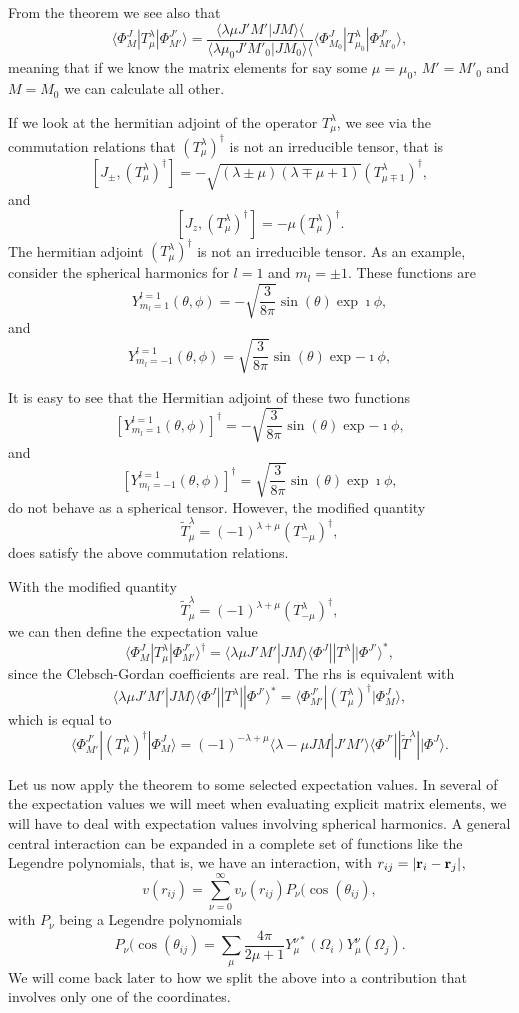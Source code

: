 {From the theorem we see also that 
\[
\langle \Phi^J_M|T^{\lambda}_{\mu}|\Phi^{J'}_{M'}\rangle=\frac{\langle \lambda \mu J'M'|JM\rangle\langle }{\langle \lambda \mu_0 J'M'_0|JM_0\rangle\langle }\langle \Phi^J_{M_0}|T^{\lambda}_{\mu_0}|\Phi^{J'}_{M'_0}\rangle,
\]
meaning that if we know the matrix elements for say some $\mu=\mu_0$, $M'=M'_0$ and $M=M_0$ we can calculate all other. 

If we look at the hermitian adjoint of the operator $T^{\lambda}_{\mu}$, 
we see via the commutation relations that $(T^{\lambda}_{\mu})^{\dagger}$ is not an irreducible tensor, that is
\[
[J_{\pm}, (T^{\lambda}_{\mu})^{\dagger}]= -\sqrt{(\lambda\pm \mu)(\lambda\mp \mu+1)}(T^{\lambda}_{\mu\mp 1})^{\dagger},
\]
and 
\[
[J_{z}, (T^{\lambda}_{\mu})^{\dagger}]=-\mu (T^{\lambda}_{\mu})^{\dagger}.
\]
The hermitian adjoint $(T^{\lambda}_{\mu})^{\dagger}$ is not an irreducible tensor. As an example, consider the spherical harmonics for 
$l=1$ and $m_l=\pm 1$. These functions are 
\[
Y^{l=1}_{m_l=1}(\theta,\phi)=-\sqrt{\frac{3}{8\pi}}\sin{(\theta)}\exp{\imath\phi},
\]
and 
\[
Y^{l=1}_{m_l=-1}(\theta,\phi)=\sqrt{\frac{3}{8\pi}}\sin{(\theta)}\exp{-\imath\phi},
\]

It is easy to see that the Hermitian adjoint of these two functions
\[
\left[Y^{l=1}_{m_l=1}(\theta,\phi)\right]^{\dagger}=-\sqrt{\frac{3}{8\pi}}\sin{(\theta)}\exp{-\imath\phi},
\]
and 
\[
\left[Y^{l=1}_{m_l=-1}(\theta,\phi)\right]^{\dagger}=\sqrt{\frac{3}{8\pi}}\sin{(\theta)}\exp{\imath\phi},
\]
do not behave as a spherical tensor. However, the modified quantity 
\[
\tilde{T}^{\lambda}_{\mu}=(-1)^{\lambda+\mu}(T^{\lambda}_{-\mu})^{\dagger},
\]
does satisfy the above commutation relations.

With the modified quantity 
\[
\tilde{T}^{\lambda}_{\mu}=(-1)^{\lambda+\mu}(T^{\lambda}_{-\mu})^{\dagger},
\]
we can then define the expectation value
\[
\langle \Phi^J_M|T^{\lambda}_{\mu}|\Phi^{J'}_{M'}\rangle^{\dagger} = \langle \lambda \mu J'M'|JM\rangle\langle \Phi^J||T^{\lambda}||\Phi^{J'}\rangle^*,
\]
since the Clebsch-Gordan coefficients are real. The rhs is equivalent with 
\[
\langle \lambda \mu J'M'|JM\rangle\langle \Phi^J||T^{\lambda}||\Phi^{J'}\rangle^*=\langle \Phi^{J'}_{M'}|(T^{\lambda}_{\mu})^{\dagger}|\Phi^{J}_{M}\rangle,
\]
which is equal to 
\[
\langle \Phi^{J'}_{M'}|(T^{\lambda}_{\mu})^{\dagger}|\Phi^{J}_{M}\rangle=(-1)^{-\lambda+\mu}\langle \lambda -\mu JM|J'M'\rangle\langle \Phi^{J'}||\tilde{T}^{\lambda}||\Phi^{J}\rangle.
\]

Let us now apply the theorem to some selected expectation values.
In several of the expectation values we will meet when evaluating explicit matrix elements, we will have to deal with expectation values involving spherical harmonics. A general central interaction can be expanded in a complete set of functions like the Legendre polynomials, that is, we have an interaction, with $r_{ij}=|{\bf r}_i-{\bf r}_j|$,
\[
v(r_{ij})=\sum_{\nu=0}^{\infty}v_{\nu}(r_{ij})P_{\nu}(\cos{(\theta_{ij})},
\]
with $P_{\nu}$ being a Legendre polynomials
\[
P_{\nu}(\cos{(\theta_{ij})}=\sum_{\mu}\frac{4\pi}{2\mu+1}Y_{\mu}^{\nu *}(\Omega_{i})Y_{\mu}^{\nu}(\Omega_{j}).
\]
We will come back later to how we split the above into a contribution that involves only one of the coordinates.

}
